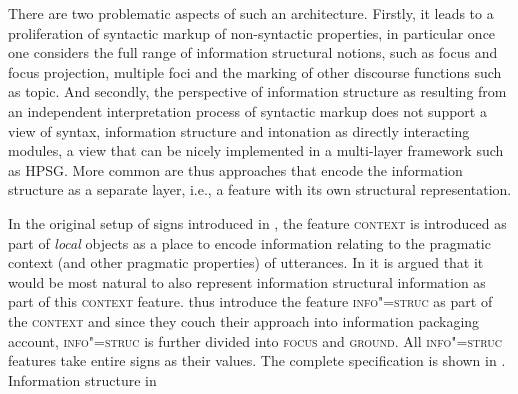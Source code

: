 \documentclass[output=paper
	        ,collection
	        ,collectionchapter
 	        ,biblatex
                ,babelshorthands
                ,newtxmath
                ,draftmode
                ,colorlinks, citecolor=brown
]{langscibook}
\begin{document}
There are two problematic aspects of such an architecture. Firstly, it
leads to a proliferation of syntactic markup of non-syntactic
properties, in particular once one considers the full range of
information structural notions, such as focus and focus projection,
multiple foci and the marking of other discourse functions such as
topic. And secondly, the perspective of information structure as
resulting from an independent interpretation process of syntactic
markup does not support a view of syntax, information structure and
intonation as directly interacting modules, a view that can be nicely
implemented in a multi-layer framework such as HPSG.
More common are thus approaches that encode the information structure
as a separate layer, i.e., a feature with its own structural
representation.

In the original setup of signs introduced in \cite{ps2}, the feature
\textsc{context} is introduced as part of \textit{local} objects as a
place to encode information relating to the pragmatic context (and
other pragmatic properties) of utterances. In \cite{EV96a} it is
argued that it would be most natural to also represent information
structural information as part of this \textsc{context}
feature. \cite{EV96a} thus introduce the feature \textsc{info"=struc}
as part of the \textsc{context} and since they couch their
approach into  information packaging account,
\textsc{info"=struc} is further divided into \textsc{focus} and
\textsc{ground}. All \textsc{info"=struc} features take entire signs as
their values. The complete specification is shown in
.
\ea \label{fig:e-v-info-struc}
Information structure in \cite[56]{EV96a}
        \leavevmode
{}
\z
\end{document}
